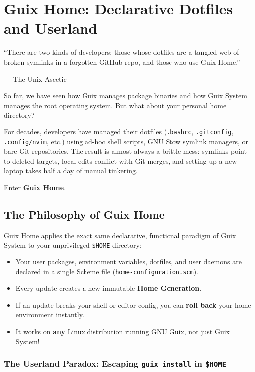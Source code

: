 \chapter{Guix Home: Declarative Dotfiles and Userland}
\label{chap:guix-home}

\epigraph{``There are two kinds of developers: those whose dotfiles are a tangled web of broken symlinks in a forgotten GitHub repo, and those who use Guix Home.''}{--- The Unix Ascetic}

\noindent
So far, we have seen how Guix manages package binaries and how Guix System manages the root operating system. But what about your personal home directory?

For decades, developers have managed their dotfiles (\texttt{.bashrc}, \texttt{.gitconfig}, \texttt{.config/nvim}, etc.) using ad-hoc shell scripts, GNU Stow symlink managers, or bare Git repositories. The result is almost always a brittle mess: symlinks point to deleted targets, local edits conflict with Git merges, and setting up a new laptop takes half a day of manual tinkering.

Enter \textbf{Guix Home}.

\section{The Philosophy of Guix Home}

Guix Home applies the exact same declarative, functional paradigm of Guix System to your unprivileged \texttt{\$HOME} directory:
\begin{itemize}
  \item Your user packages, environment variables, dotfiles, and user daemons are declared in a single Scheme file (\texttt{home-configuration.scm}).
  \item Every update creates a new immutable \textbf{Home Generation}.
  \item If an update breaks your shell or editor config, you can \textbf{roll back} your home environment instantly.
  \item It works on \textbf{any} Linux distribution running GNU Guix, not just Guix System!
\end{itemize}

\subsection{The Userland Paradox: Escaping \texttt{guix install} in \texttt{\$HOME}}


